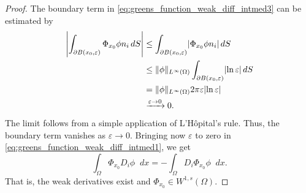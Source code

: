 \documentclass[english, 12pt, a4paper, sci, utf8, a-2b, online]{aaltothesis}
\theoremstyle{definition}
\theoremstyle{plain}
\DeclarePairedDelimiter\abs{\lvert}{\rvert}
\DeclarePairedDelimiter\norm{\lVert}{\rVert}
\newcommand*\diff{\mathop{}\!d}
\numberwithin{equation}{section}
\begin{document}
\begin{proof}
    The boundary term in \eqref{eq:greens_function_weak_diff_intmed3}
    can be estimated by
    \begin{align*}
        \abs*{\int_{\partial B(x_0,\varepsilon)} \Phi_{x_0} \phi n_i \diff S}
        &\leq \int_{\partial B(x_0,\varepsilon)} \abs{\Phi_{x_0} \phi n_i} \diff S\\
        &\leq \norm{\phi}_{L^{\infty}(\Omega)}
            \int_{\partial B(x_0,\varepsilon)} \abs*{\ln \varepsilon} \diff S \\
        &= \norm{\phi}_{L^{\infty}(\Omega)} 2 \pi \varepsilon \abs{\ln \varepsilon} \\
        &\xrightarrow[]{\varepsilon \to 0} 0.
    \end{align*}
    The limit follows from a simple application of L'Hôpital's rule.
    Thus, the boundary term vanishes as $\varepsilon \to 0$.
    Bringing now $\varepsilon$ to zero in 
    \eqref{eq:greens_function_weak_diff_intmed1}, we get
    \begin{equation*}
        \int_{\Omega} \Phi_{x_0} D_i \phi \diff x
        = - \int_{\Omega} D_i \Phi_{x_0} \phi \diff x.
    \end{equation*}
    That is, the weak derivatives exist and $\Phi_{x_0} \in W^{1,s}(\Omega)$.


\end{proof}
\end{document}

